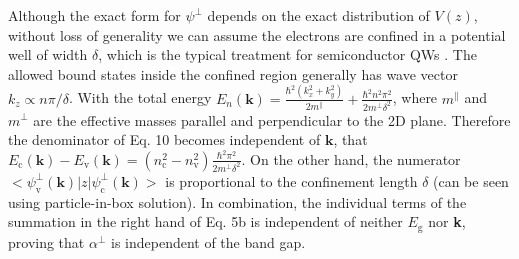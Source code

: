 \documentclass[manuscript=suppinfo,email=true,hyperref=true,keywords=false]{achemso}
\begin{document}
Although the exact form for $\psi^{\perp}$ depends on the exact
distribution of $V(z)$, without loss of generality we can assume the
electrons are confined in a potential well of width $\delta$, which is
the typical treatment for semiconductor QWs
\cite{ihn_semiconductor_2009}. The allowed bound states inside the
confined region generally has wave vector
$k_{z} \propto n \pi / \delta$. With the total energy
$E_{n}(\mathbf{k}) = {\displaystyle \frac{\hbar^{2} (k_{x}^{2} +
    k_{y}^{2})}{2 m^{\parallel}} + \frac{\hbar^{2} n^{2} \pi^{2}}{2
    m^{\perp} \delta^{2}}}$, where $m^{\parallel}$ and $m^{\perp}$ are
the effective masses parallel and perpendicular to the 2D
plane. Therefore the denominator of Eq. 10 becomes independent of
$\mathbf{k}$, that
$E_{\mathrm{c}}(\mathbf{k}) - E_{\mathrm{v}}(\mathbf{k}) =
(n_{\mathrm{c}}^{2} - n_{\mathrm{v}}^{2}) {\displaystyle
  \frac{\hbar^{2} \pi^{2}}{2 m^{\perp} \delta^{2}}}$. On the other
hand, the numerator
$<\psi^{\perp}_{\mathrm{v}}(\mathbf{k})|z|\psi^{\perp}_{\mathrm{c}}(\mathbf{k})>$
is proportional to the confinement length $\delta$ (can be seen using
particle-in-box solution\cite{davies_physics_1997}). In combination,
the individual terms of the summation in the right hand of Eq. 5b is
independent of neither $E_{\mathrm{g}}$ nor \textbf{k}, proving that
$\alpha^{\perp}$ is independent of the band gap.
\end{document}
